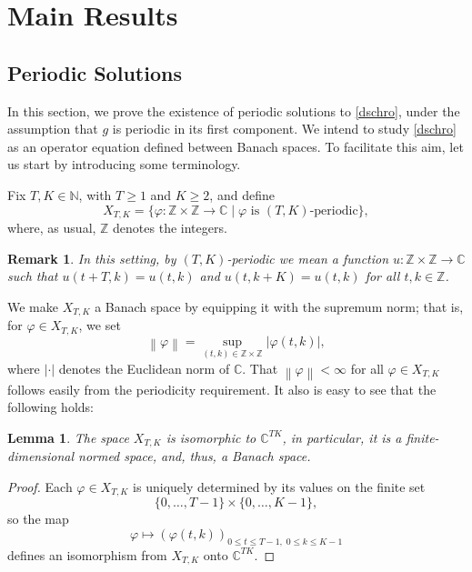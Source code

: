\documentclass[10pt,a4paper]{amsart}
\newcommand{\N}{\mathbb{N}}
\newcommand{\C}{\mathbb{C}}
\newcommand{\Z}{\mathbb{Z}}
\newcommand{\norm}[1]{\left \lVert #1 \right \rVert}
\newcommand{\bes}{\begin{equation*}}
\newcommand{\ees}{\end{equation*}}
\renewcommand{\phi}{\varphi}
\numberwithin{equation}{section}
\newtheorem{lemma}[theorem]{Lemma}
\newtheorem{remark}[theorem]{\bf Remark}
\begin{document}
\section{Main Results}\label{Main}
\subsection{Periodic Solutions}

In this section, we prove the existence of periodic solutions to \eqref{dschro}, under the assumption that $g$ is periodic in its first component. We intend to study \eqref{dschro} as an operator equation defined between Banach spaces.   To facilitate this aim, let us start by introducing some terminology.

Fix $T, K\in \N$, with $T\geq 1$ and $K\geq 2$, and define
\bes
X_{T,K}=\{\phi:\Z\times \Z\to \C\mid \phi \text{ is } (T,K)\text{-periodic}\},
\ees
where, as usual, $\Z$ denotes the integers.

\begin{remark}
In this setting, by $(T,K)$-periodic we mean a function $u:\Z\times \Z\to \C$ such that $u(t+T,k)=u(t,k)$  and $u(t, k+K)=u(t,k)$ for all $t,k\in \Z$.
\end{remark}

We make $X_{T,K}$ a Banach space by equipping it with the supremum norm; that is, for $\phi\in X_{T,K}$, we set
\bes
\norm{\phi}=\sup_{(t,k)\in \Z\times \Z}|\phi(t,k)|,
\ees
where $|\cdot|$ denotes the Euclidean norm of $\C$. That $\norm{\phi} <\infty$ for all $\phi\in X_{T,K}$ follows easily from the periodicity requirement.  It also is easy to see that the following holds:

\begin{lemma}
The space $X_{T,K}$ is isomorphic to $\C^{TK}$, in particular, it is a finite-dimensional normed space, and, thus, a Banach space.
\end{lemma}

\begin{proof}
Each $\phi\in X_{T,K}$ is uniquely determined by its values on the finite set
\bes
\{0,\dots,T-1\}\times \{0,\dots,K-1\},
\ees
so the map
\bes
\phi\mapsto (\phi(t,k))_{0\leq t\leq T-1,\;0\leq k\leq K-1}
\ees
defines an isomorphism from $X_{T,K}$ onto $\C^{TK}$.
\end{proof}
 
\end{document}
